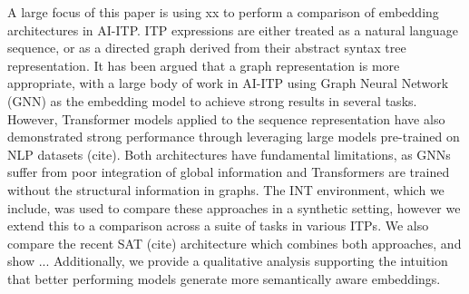 \documentclass[letterpaper]{article} %
\begin{document}
    A large focus of this paper is using xx to perform a comparison of embedding architectures in AI-ITP.
    ITP expressions are either treated as a natural language sequence,
    or as a directed graph derived from their abstract syntax tree representation.
    It has been argued that a graph representation is more appropriate, with a large body of work in AI-ITP
    using Graph Neural Network (GNN) as the embedding model to achieve strong results
    in several tasks\cite{wang_premise_nodate, paliwal_graph_2019, bansal_learning_2019}.
    However, Transformer models applied to the sequence representation have also demonstrated strong performance through
    leveraging large models pre-trained on NLP datasets (cite).
    Both architectures have fundamental limitations, as GNNs suffer from poor integration of global information and
    Transformers are trained without the structural information in graphs.
    The INT environment, which we include, was used to compare these approaches in a synthetic setting,
    however we extend this to a comparison across a suite of tasks in various ITPs.
    We also compare the recent SAT (cite) architecture which combines both approaches, and show ...
    Additionally, we provide a qualitative analysis supporting the intuition that better performing models
    generate more semantically aware embeddings.





\end{document}
